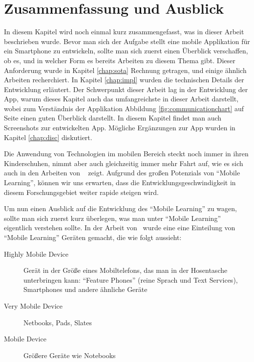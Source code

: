 
\chapter{Zusammenfassung und Ausblick}
\label{chap:concl}

In diesem Kapitel wird noch einmal kurz zusammengefasst, was in dieser Arbeit beschrieben wurde.
Bevor man sich der Aufgabe stellt eine mobile Applikation für ein Smartphone zu entwickeln, sollte
man sich zuerst einen Überblick verschaffen, ob es, und in welcher Form es bereits Arbeiten zu 
diesem Thema gibt. Dieser Anforderung wurde in Kapitel \ref{chap:sota} Rechnung getragen, und einige
ähnlich Arbeiten recherchiert.
In Kapitel \ref{chap:impl} wurden die technischen Details der Entwicklung erläutert. 
Der Schwerpunkt dieser Arbeit lag in der Entwicklung der App, warum dieses Kapitel auch das umfangreichste
in dieser Arbeit darstellt, wobei zum Verständnis der Applikation Abbildung \ref{fig:communicationchart}
auf Seite \pageref{fig:communicationchart} einen guten Überblick darstellt. In diesem Kapitel findet
man auch Screenshots zur entwickelten App.
Mögliche Ergänzungen zur App wurden in Kapitel \ref{chap:disc} diskutiert.


Die Anwendung von Technologien im mobilen Bereich steckt noch immer in ihren Kinderschuhen, 
nimmt aber auch gleichzeitig immer mehr Fahrt auf, wie es sich auch in den Arbeiten von ~\cite{Ebner2013} zeigt. 
Aufgrund des großen Potenzials von \enquote{Mobile Learning}, können wir uns erwarten, 
dass die Entwicklungsgeschwindigkeit in diesem Forschungsgebiet weiter rapide steigen wird.

Um nun einen Ausblick auf die Entwicklung des \enquote{Mobile Learning} zu wagen, sollte 
man sich zuerst kurz überlegen, was man unter \enquote{Mobile Learning} eigentlich
verstehen sollte. In der Arbeit von~\cite{Brown2010} wurde eine eine Einteilung von \enquote{Mobile Learning}
Geräten gemacht, die wie folgt aussieht: 
\begin{description}
	\item[Highly Mobile Device] Gerät in der Größe eines Mobiltelefons, das man in der Hosentasche
	unterbringen kann: \enquote{Feature Phones} (reine Sprach und Text Services), Smartphones und andere ähnliche Geräte
	\item[Very Mobile Device] Netbooks, Pads, Slates
	\item[Mobile Device] Größere Geräte wie Notebooks
\end{description}

